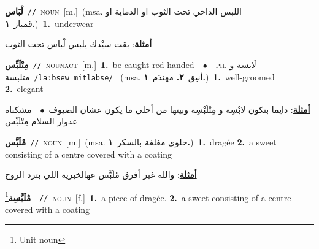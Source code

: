 \documentclass[10pt,a4paper,twoside]{article} %
\begin{document}
\begin{multicols}{2}
{\setlength\topsep{0pt}\textbf{\foreignlanguage{arabic}{لْبَاس}}\ {\color{gray}\texttt{//}\color{black}}\ \textsc{noun}\ [m.]\ \color{gray}(msa. \foreignlanguage{arabic}{اللبس الداخي تحت الثوب او الدماية او قمباز}~\foreignlanguage{arabic}{\textbf{١.}})\color{black}\ \textbf{1.}~underwear\  \begin{flushright}\color{gray}\foreignlanguage{arabic}{\textbf{\underline{\foreignlanguage{arabic}{أمثلة}}}: بقت سيْدك يلبس لْباس تحت الثوب}\end{flushright}\color{black}} \vspace{2mm}

{\setlength\topsep{0pt}\textbf{\foreignlanguage{arabic}{مِتْلَبِّس}}\ {\color{gray}\texttt{//}\color{black}}\ \textsc{noun\textunderscore act}\ [m.]\ \textbf{1.}~be caught red-handed\ \ $\bullet$\ \ \textsc{ph.} \color{gray} \foreignlanguage{arabic}{لَابسة و متلبسة}\color{black}\ {\color{gray}\texttt{/{\sffamily laːbsew mitlabse}/}\color{black}}\ \color{gray} (msa. \foreignlanguage{arabic}{أنيق}~\foreignlanguage{arabic}{\textbf{٢.}}  \foreignlanguage{arabic}{مهندَم}~\foreignlanguage{arabic}{\textbf{١.}})\color{black}\ \textbf{1.}~well-groomed  \textbf{2.}~elegant\  \begin{flushright}\color{gray}\foreignlanguage{arabic}{\textbf{\underline{\foreignlanguage{arabic}{أمثلة}}}: دايما بتكون لابْسِة و مِتْلَبْسِة وبيتها من أحلى ما يكون عشان الضيوف\ $\bullet$\ \  مشكناه عدوار السلام مِتْلَبِّس}\end{flushright}\color{black}} \vspace{2mm}

{\setlength\topsep{0pt}\textbf{\foreignlanguage{arabic}{مْلَبَّس}}\ {\color{gray}\texttt{//}\color{black}}\ \textsc{noun}\ [m.]\ \color{gray}(msa. \foreignlanguage{arabic}{حلوى مغلفة بالسكر}~\foreignlanguage{arabic}{\textbf{١.}})\color{black}\ \textbf{1.}~dragée  \textbf{2.}~a sweet consisting of a centre covered with a coating\  \begin{flushright}\color{gray}\foreignlanguage{arabic}{\textbf{\underline{\foreignlanguage{arabic}{أمثلة}}}: والله غير أفرق مْلَبَّس عهالخبرية اللي بترد الروح}\end{flushright}\color{black}} \vspace{2mm}

{\setlength\topsep{0pt}\textbf{\foreignlanguage{arabic}{مْلَبَّسِة}}\footnote{Unit noun}\ \ {\color{gray}\texttt{//}\color{black}}\ \textsc{noun}\ [f.]\ \textbf{1.}~a piece of dragée.  \textbf{2.}~a sweet consisting of a centre covered with a coating\ } \vspace{2mm}


\end{multicols}
\end{document}
